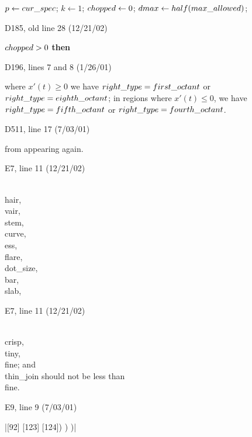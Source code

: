 {\ninepoint\noindent
\quad$p\gets\\{cur\_spec}$; $k\gets1$; $\\{chopped}\gets0$;
 $\\{dmax}\gets\\{half}(\\{max\_allowed})$;

\bugonpage D185, old line 28 (12/21/02)

\ninepoint\noindent
{} $\\{chopped}>0$ {\bf then}

\bugonpage D196, lines 7 and 8 (1/26/01)

\tenpoint\noindent
where $x'(t)\ge0$ we have $\\{right\_type}=%
\\{first\_octant}$ or $\\{right\_type}=\\{eighth\_octant}$; in regions where
$x'(t)\le0$,
we have $\\{right\_type}=\\{fifth\_octant}$ or $\\{right\_type}=\\{fourth%
\_octant}$.

\bugonpage D511, line 17 (7/03/01)

\tenpoint\noindent
from appearing again.

\hsize=29pc

\bugonpage E7, line 11 (12/21/02)

\ninepoint\indent
\\{hair}, \\{vair}, \\{stem}, \\{curve}, \\{ess}, \\{flare}, \\{dot\_size},
 \\{bar}, \\{slab},

\bugonpage E7, line 11 (12/21/02)

\ninepoint\indent
\\{crisp}, \\{tiny}, \\{fine};
\medskip\noindent
and \\{thin\_join} should not be less than \\{fine}.

\bugonpage E9, line 9 (7/03/01)

\tenpoint\indent
|[92] [123] [124]) ) )|

}
